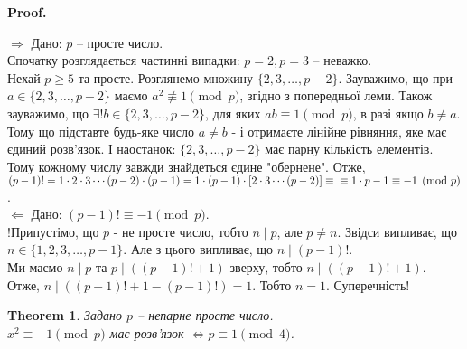 \documentclass[a4paper, 14pt]{extarticle}
\makeatletter
\theoremstyle{theoremdd}
\newtheorem{theorem}{Theorem}[subsection]
\theoremstyle{theoremdd}
\theoremstyle{theoremdd}
\theoremstyle{theoremdd}
\theoremstyle{theoremdd}
\theoremstyle{theoremdd}
\theoremstyle{theoremdd}
\theoremstyle{theoremdd}
\def\qed{$\blacksquare$}
\def\rightproof{$\boxed{\Rightarrow}$ }
\def\leftproof{$\boxed{\Leftarrow}$ }
\renewenvironment{proof}[1][Proof.\\]{\par
\pushQED{\hfill \qed}%
\normalfont \topsep6\p@\@plus6\p@\relax
\trivlist
\item\relax
{\bfseries
#1\@addpunct{.}}\hspace\labelsep\ignorespaces
}{%
\popQED\endtrivlist\@endpefalse
}
\makeatother
\begin{document}
\begin{proof}
\rightproof Дано: $p$ -- просте число.\\
Спочатку розглядається частинні випадки: $p=2,p=3$ -- неважко.\\
Нехай $p \geq 5$ та просте. Розглянемо множину $\{2,3,\dots,p-2\}$. Зауважимо, що при $a \in \{2,3,\dots,p-2\}$ маємо $a^2 \not\equiv 1 \pmod p$, згідно з попередньої леми. Також зауважимо, що $\exists ! b \in \{2,3,\dots,p-2\}$, для яких $ab \equiv 1 \pmod p$, в разі якщо $b \neq a$. Тому що підставте будь-яке число $a \neq b$ - і отримаєте лінійне рівняння, яке має єдиний розв'язок. І наостанок: $\{2,3,\dots,p-2\}$ має парну кількість елементів. Тому кожному числу завжди знайдеться єдине "обернене". Отже,\\
$(p-1)! = 1 \cdot 2 \cdot 3 \cdots (p-2) \cdot (p-1) = 1 \cdot (p-1) \cdot [2 \cdot 3 \cdots (p-2)] \equiv \\ \equiv 1 \cdot p-1 \equiv -1 \pmod p$.
\bigskip \\
\leftproof Дано: $(p-1)! \equiv -1 \pmod p$.\\
!Припустімо, що $p$ - не просте число, тобто $n \mid p$, але $p \neq n$. Звідси випливає, що $n \in \{1,2,3,\dots,p-1\}$. Але з цього випливає, що $n \mid (p-1)!$.\\
Ми маємо $n \mid p$ та $p \mid ((p-1)!+1)$ зверху, тобто $n \mid ((p-1)!+1)$.\\
Отже, $n \mid ((p-1)!+1 - (p-1)!) = 1$. Тобто $n = 1$. Суперечність!
\end{proof}

\begin{theorem}
Задано $p$ -- непарне просте число.\\
$x^2 \equiv -1 \pmod p$ має розв'язок $\iff p \equiv 1 \pmod 4$.
\end{theorem}
\end{document}
